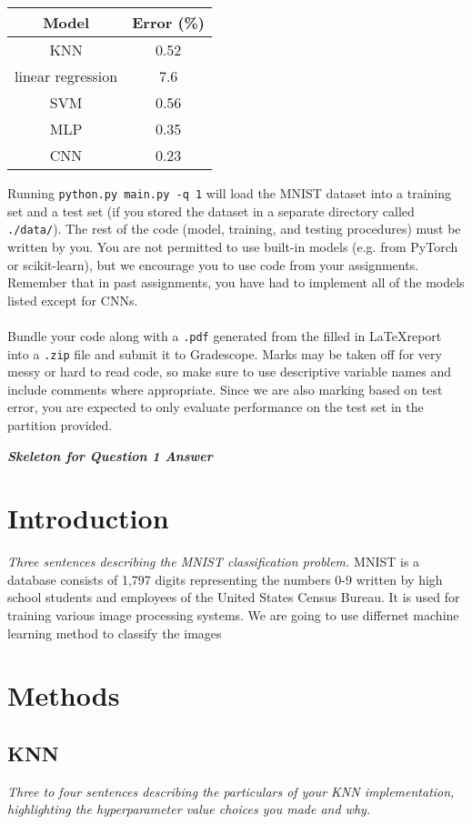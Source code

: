 \documentclass{article}
\def\gre#1{{\color{gre}#1}}
\begin{document}
\begin{center}
 \begin{tabular}{|c | c |} 
 \hline
 Model & Error (\%) \\ [0.5ex]
 \hline\hline
 KNN & 0.52 \\
 linear regression & 7.6 \\
 SVM & 0.56 \\
 MLP & 0.35 \\
 CNN & 0.23 \\ 
 \hline 
\end{tabular}
\end{center}
\medskip
Running \texttt{python.py main.py -q 1} will load the MNIST dataset into a training set and a test set (if you stored the dataset in a separate directory called \texttt{./data/}). The rest of the code (model, training, and testing procedures) must be written by you. You are not permitted to use built-in models (e.g. from PyTorch or scikit-learn), but we encourage you to use code from your assignments. Remember that in past assignments, you have had to implement all of the models listed except for CNNs.\\
\\
Bundle your code along with a \texttt{.pdf} generated from the filled in \LaTeX  report into a \texttt{.zip} file and submit it to Gradescope. Marks may be taken off for very messy or hard to read code, so make sure to use descriptive variable names and include comments where appropriate. Since we are also marking based on test error, you are expected to only evaluate performance on the test set in the partition provided.

{\em \bf Skeleton for Question 1 Answer}

\section{Introduction}

\emph{Three sentences describing the MNIST classification problem.}
\gre{MNIST is a database consists of 1,797 digits representing the numbers 0-9 written by high school students and employees of the United States Census Bureau. It is used for training various image processing systems. We are going to use differnet machine learning method to classify the images}
\section{Methods}
\subsection{KNN}
\emph{Three to four sentences describing the particulars of your KNN implementation, highlighting the hyperparameter value choices you made and why.}
\end{document}
